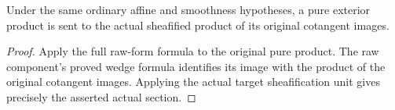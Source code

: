 \begin{corollary}\label{sc0-exterior-pullback-sections:wedge}
\leanok
{}
Under the same ordinary affine and smoothness hypotheses, a pure exterior product is sent to the actual sheafified product of its original cotangent images.
\end{corollary}
\begin{proof}
Apply the full raw-form formula to the original pure product. The raw component's proved wedge formula identifies its image with the product of the original cotangent images. Applying the actual target sheafification unit gives precisely the asserted actual section.
\end{proof}
